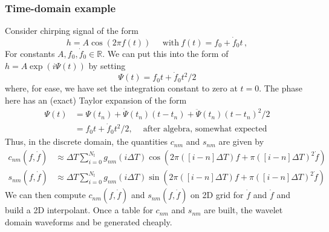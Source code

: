 \documentclass{article}
\begin{document}
\subsubsection{Time-domain example}
Consider chirping signal of the form
\begin{equation}
h = A\cos(2\pi f(t))\, \quad \ \text{with} \ f(t) = f_{0} + \dot{f}_{0}t \label{eq:lookup_chirp_example_signal}\,,
\end{equation}
For constants $A, f_{0}, \dot{f}_{0} \in \mathbb{R}$. We can put this into the form of $h = A\exp(i\Psi(t))$ by setting 
\begin{equation}
\Psi(t) = f_{0}t + \dot{f}_{0}t^2 / 2 
\end{equation}
where, for ease, we have set the integration constant to zero at $t = 0$. The phase here has an (exact) Taylor expansion of the form
\begin{align}
\Psi(t) &= \Psi(t_{n}) + \dot{\Psi}(t_{n})(t - t_{n}) + \ddot{\Psi}(t_{n})(t - t_{n})^2 / 2 \\
&= f_{0}t + \dot{f}_{0}t^2 / 2, \quad \ \text{after algebra, somewhat expected} 
\end{align}
Thus, in the discrete domain, the quantities $c_{nm}$ and $s_{nm}$ are given by 
\begin{align}
c_{nm}(f,\dot{f}) &\approx \Delta T\sum_{i = 0}^{N_{t}}g_{nm}(i\Delta T)\cos(2\pi([i - n]\Delta T)f + \pi([i - n]\Delta T)^2 \dot{f}) \\
s_{nm}(f,\dot{f}) &\approx \Delta T\sum_{i = 0}^{N_{t}}g_{nm}(i\Delta T)\sin(2\pi([i - n]\Delta T)f + \pi([i - n]\Delta T)^2 \dot{f})
\end{align}
We can then compute $c_{nm}(f,\dot{f})$ and $s_{nm}(f,\dot{f})$ on 2D grid for $\dot{f}$ and $\dot{f}$ and build a 2D interpolant. Once a table for $c_{nm}$ and $s_{nm}$ are built, the wavelet domain waveforms and be generated cheaply.  



     
\end{document}
